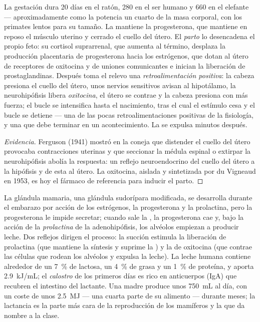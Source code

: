\begin{proposition}\label{prop:b2:mammal-reproduction:birth}
La gestación dura \num{20} días en el ratón, \num{280} en el ser humano y
\num{660} en el elefante --- aproximadamente como la potencia un cuarto de
la masa corporal, con los primates lentos para su tamaño. La mantiene la
progesterona, que mantiene en reposo el músculo uterino y cerrado el
cuello del útero. El \emph{parto} lo desencadena el propio feto: su cortisol
suprarrenal, que aumenta al término, desplaza la producción placentaria
de progesterona hacia los estrógenos, que dotan al útero de receptores de
oxitocina y de uniones comunicantes e inician la liberación de
prostaglandinas. Después toma el relevo una \emph{retroalimentación
positiva}: la cabeza presiona el cuello del útero, unos nervios
sensitivos avisan al hipotálamo, la neurohipófisis libera
\emph{oxitocina}, el útero se contrae y la cabeza presiona con más
fuerza; el bucle se intensifica hasta el nacimiento, tras el cual el
estímulo cesa y el bucle se detiene --- una de las pocas
retroalimentaciones positivas de la fisiología, y una que debe terminar
en un acontecimiento. La  se expulsa minutos después.
\end{proposition}
\begin{proof}[Evidencia]
Ferguson (1941) mostró en la coneja que distender el cuello del útero
provocaba contracciones uterinas y que seccionar la médula espinal o
extirpar la neurohipófisis abolía la respuesta: un reflejo
neuroendocrino del cuello del útero a la hipófisis y de esta al útero.
La oxitocina, aislada y sintetizada por du Vigneaud en 1953, es hoy el
fármaco de referencia para inducir el parto.
\end{proof}

\begin{proposition}[La lactancia]\label{prop:b2:mammal-reproduction:lactation}
La glándula mamaria, una glándula sudorípara modificada, se desarrolla
durante el embarazo por acción de los estrógenos, la progesterona y la
prolactina, pero la progesterona le impide secretar; cuando sale la
, la progesterona cae y, bajo la acción de la \emph{prolactina}
de la adenohipófisis, los alvéolos empiezan a producir leche. Dos reflejos
dirigen el proceso: la succión estimula la liberación de prolactina (que
mantiene la síntesis y suprime la ) y la de oxitocina (que
contrae las células que rodean los alvéolos y expulsa la leche). La leche
humana contiene alrededor de un \qty{7}{\%} de lactosa, un \qty{4}{\%} de
grasa y un \qty{1}{\%} de proteína, y aporta
\qty{2.9}{kJ/mL}; el \emph{calostro} de los primeros días es rico en
anticuerpos (IgA) que recubren el intestino del lactante. Una madre
produce unos \qty{750}{mL} al día, con un coste de unos \qty{2.5}{MJ} ---
una cuarta parte de su alimento --- durante meses; la lactancia es la
parte más cara de la reproducción de los mamíferos y la que da nombre a
la clase.
\end{proposition}

